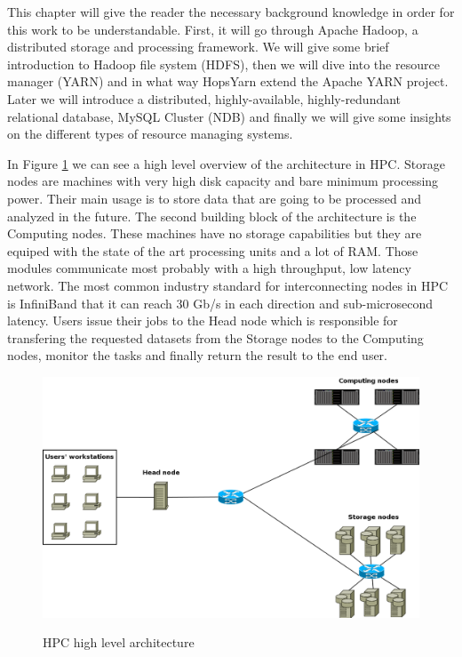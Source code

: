 This chapter will give the reader the necessary background knowledge
in order for this work to be understandable. First, it will go through
Apache Hadoop, a distributed storage and processing framework. We will
give some brief introduction to Hadoop file system (HDFS), then we
will dive into the
resource manager (YARN) and in what way HopsYarn extend the Apache
YARN project. Later we will introduce a distributed, highly-available,
highly-redundant relational database, MySQL Cluster (NDB) and finally
we will give some insights on the different types of resource managing
systems.

In Figure \ref{fig:back_hpc_arch_overview} we can see a high level
overview of the architecture in HPC. Storage nodes are machines with very high disk capacity and bare
minimum processing power. Their main usage is to store data that are
going to be processed and analyzed in the future. The second building
block of the architecture is the Computing nodes. These machines have
no storage capabilities but they are equiped with the state of the art
processing units and a lot of RAM. Those modules communicate most
probably with a high throughput, low latency network. The most common
industry standard for interconnecting nodes in HPC is InfiniBand
\cite{infiniband} that it can
reach 30 Gb/s in each direction and sub-microsecond latency. Users
issue their jobs to the Head node which is responsible for transfering
the requested datasets from the Storage nodes to the Computing nodes,
monitor the tasks and finally return the result to the end user.

\begin{figure}
\centering
\includegraphics[scale=0.35]{resources/images/Background/hpc_arch_overview.png}
\label{fig:back_hpc_arch_overview}
\caption{HPC high level architecture}
\end{figure}

